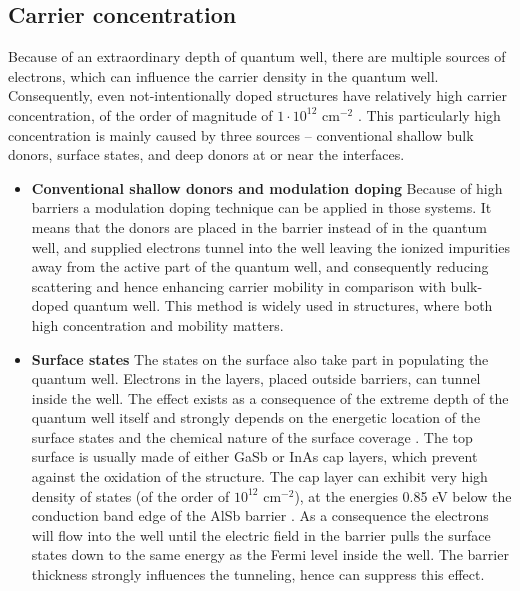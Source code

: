 \documentclass[titlepage,a4paper]{book}
\begin{document}
\subsection{Carrier concentration}
Because of an extraordinary depth of quantum well, there are multiple sources of electrons, which can influence the carrier density in the quantum well. Consequently, even not-intentionally doped structures have relatively high carrier concentration, of the order of magnitude of $1 \cdot 10^{12}$ cm$^{-2}$ \cite{Tuttle_InAs_concentration}. This particularly high concentration is mainly caused by three sources -- conventional shallow bulk donors, surface states, and deep donors at or near the interfaces. 
\begin{itemize}
\item \textbf{Conventional shallow donors and modulation doping} \newline 
Because of high barriers a modulation doping technique can be applied in those systems. It means that the donors are placed in the barrier instead of in the quantum well, and supplied electrons tunnel into the well leaving the ionized impurities away from the active part of the quantum well, and consequently reducing scattering and hence enhancing carrier mobility in comparison with bulk-doped quantum well. This method is widely used in structures, where both high concentration and mobility matters.

\item \textbf{Surface states} \newline
The states on the surface also take part in populating the quantum well. Electrons in the layers, placed outside barriers, can tunnel inside the well. The effect exists as a consequence of the extreme depth of the quantum well itself and strongly depends on the energetic location of the surface states and the chemical nature of the surface coverage \cite{Kroemer_review}. The top surface is usually made of either GaSb or InAs cap layers, which prevent against the oxidation of the structure. The cap layer can exhibit very high density of states (of the order of $10^{12}$ cm$^{-2}$), at the energies 0.85 eV below the conduction band edge of the AlSb barrier \cite{Nguyen_SurfaceDonor}. As a consequence the electrons will flow into the well until the electric field in the barrier pulls the surface states down to the same energy as the Fermi level inside the well. The barrier thickness strongly influences the tunneling, hence can suppress this effect.


\end{itemize}
\end{document}
